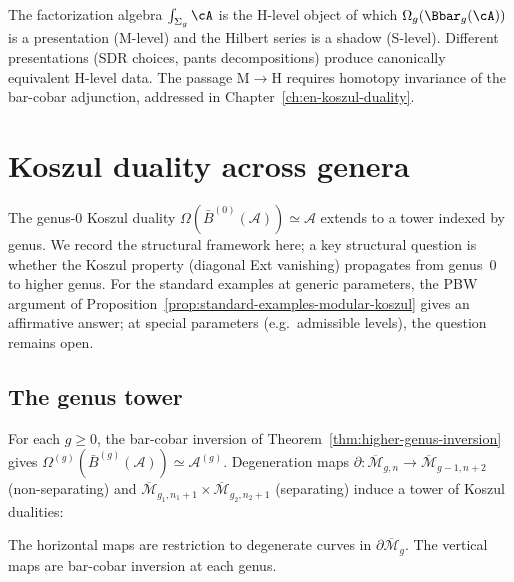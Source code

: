 \begin{remark}
\label{rem:factorization-natural}
The factorization algebra $\int_{\Sigma_g}\cA$ is the H-level object
of which $\Omega_g(\Bbar_g(\cA))$ is a presentation (M-level) and
the Hilbert series is a shadow (S-level).
Different presentations (SDR choices, pants decompositions) produce
canonically equivalent H-level data.
The passage M$\to$H requires homotopy invariance of the bar-cobar
adjunction, addressed in Chapter~\ref{ch:en-koszul-duality}.
\end{remark}


\section{Koszul duality across genera}\label{sec:koszul-across-genera}\label{app:koszul_higher_genus}

The genus-0 Koszul duality $\Omega(\bar{B}^{(0)}(\mathcal{A})) \simeq \mathcal{A}$ extends
to a tower indexed by genus.  We record the structural framework here;
a key structural question is whether the Koszul property (diagonal Ext vanishing)
propagates from genus~0 to higher genus.  For the standard examples at generic
parameters, the PBW argument of Proposition~\ref{prop:standard-examples-modular-koszul}
gives an affirmative answer; at special parameters (e.g.\ admissible levels),
the question remains open.

\subsection{The genus tower}

For each $g \geq 0$, the bar-cobar inversion of Theorem~\ref{thm:higher-genus-inversion}
gives $\Omega^{(g)}(\bar{B}^{(g)}(\mathcal{A})) \simeq \mathcal{A}^{(g)}$.
Degeneration maps $\partial\colon \overline{\mathcal{M}}_{g,n} \to
\overline{\mathcal{M}}_{g-1,n+2}$ (non-separating) and
$\overline{\mathcal{M}}_{g_1,n_1+1} \times \overline{\mathcal{M}}_{g_2,n_2+1}$
(separating) induce a tower of Koszul dualities:
\begin{center}
\end{center}
The horizontal maps are restriction to degenerate curves in $\partial\overline{\mathcal{M}}_g$.
The vertical maps are bar-cobar inversion at each genus.

